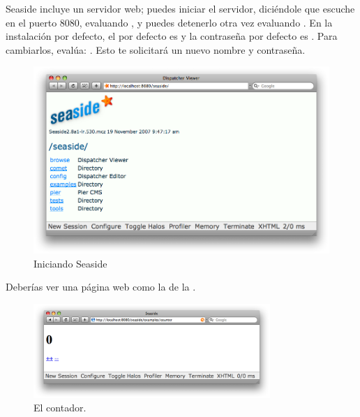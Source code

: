 \documentclass[a4paper,10pt,twoside]{book}
\begin{document}

Seaside incluye un servidor web; puedes iniciar el servidor, diciéndole que escuche en el puerto 8080, evaluando  ,
y puedes detenerlo otra vez evaluando .
En la instalación por defecto, el  por defecto es  y la contraseña por defecto es .
Para cambiarlos, evalúa:  .
Esto te solicitará un nuevo nombre y contraseña.

\begin{figure}[tbh]
\begin{center}
\includegraphics[width=\textwidth]{seasideStartup}
\caption{Iniciando Seaside}
\end{center}
\end{figure}


\noindent
Deberías ver una página web como la de la .

\noindent
{}

\begin{figure}[htb]
\begin{center}
\includegraphics[width=0.8\textwidth]{counter}
\caption{El contador.}
\end{center}
\end{figure}
\end{document}
